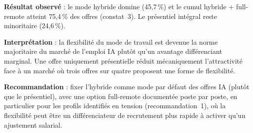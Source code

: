 \begin{recommandation}
\textbf{Résultat observé} : le mode hybride domine (45,7\,\%) et le
cumul hybride + full-remote atteint 75,4\,\% des offres (constat~3).
Le présentiel intégral reste minoritaire (24,6\,\%).

\textbf{Interprétation} : la flexibilité du mode de travail est devenue
la norme majoritaire du marché de l'emploi IA plutôt qu'un avantage
différenciant marginal. Une offre uniquement présentielle réduit
mécaniquement l'attractivité face à un marché où trois offres sur
quatre proposent une forme de flexibilité.

\textbf{Recommandation} : fixer l'hybride comme mode par défaut des
offres IA (plutôt que le présentiel), avec une option full-remote
documentée poste par poste, en particulier pour les profils identifiés
en tension (recommandation~1), où la flexibilité peut être un
différenciateur de recrutement plus rapide à activer qu'un ajustement
salarial.
\end{recommandation}
